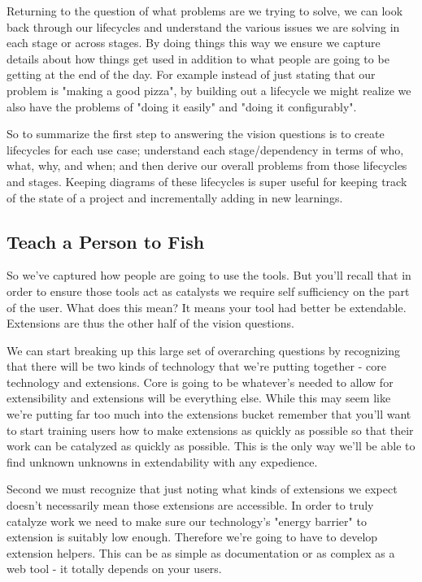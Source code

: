 \documentclass[10pt,a5paper]{book}
\begin{document}
Returning to the question of what problems are we trying to solve, we can look back through our lifecycles and understand the various issues we are solving in each stage or across stages. By doing things this way we ensure we capture details about how things get used in addition to what people are going to be getting at the end of the day. For example instead of just stating that our problem is "making a good pizza", by building out a lifecycle we might realize we also have the problems of "doing it easily" and "doing it configurably". 

So to summarize the first step to answering the vision questions is to create lifecycles for each use case; understand each stage/dependency in terms of who, what, why, and when; and then derive our overall problems from those lifecycles and stages. Keeping diagrams of these lifecycles is super useful for keeping track of the state of a project and incrementally adding in new learnings. 

\subsection{Teach a Person to Fish}
So we've captured how people are going to use the tools. But you'll recall that in order to ensure those tools act as catalysts we require self sufficiency on the part of the user. What does this mean? It means your tool had better be extendable. Extensions are thus the other half of the vision questions. 

We can start breaking up this large set of overarching questions by recognizing that there will be two kinds of technology that we're putting together - core technology and extensions. Core is going to be whatever's needed to allow for extensibility and extensions will be everything else. While this may seem like we're putting far too much into the extensions bucket remember that you'll want to start training users how to make extensions as quickly as possible so that their work can be catalyzed as quickly as possible. This is the only way we'll be able to find unknown unknowns in extendability with any expedience. 

Second we must recognize that just noting what kinds of extensions we expect doesn't necessarily mean those extensions are accessible. In order to truly catalyze work we need to make sure our technology's "energy barrier" to extension is suitably low enough. Therefore we're going to have to develop extension helpers. This can be as simple as documentation or as complex as a web tool - it totally depends on your users. 
\end{document}
